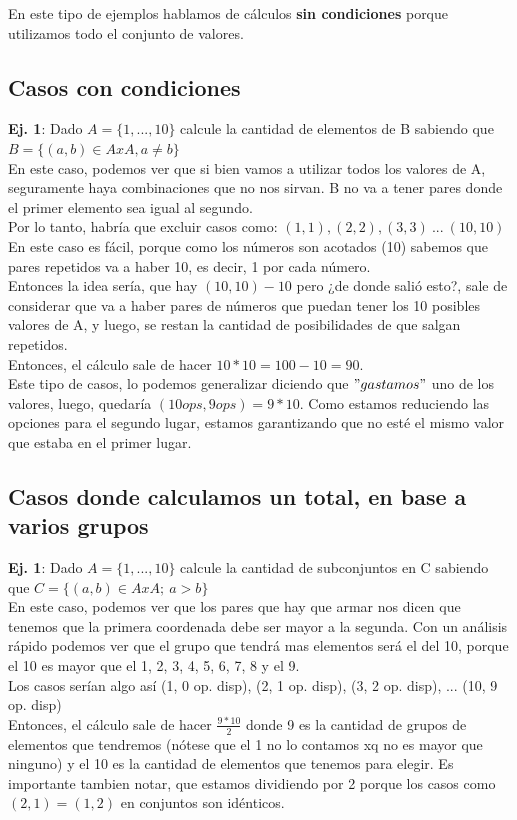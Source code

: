 \documentclass[10pt,a4paper]{article}
\begin{document}
En este tipo de ejemplos hablamos de cálculos \textbf{sin condiciones} porque utilizamos todo el conjunto de valores.
\subsection*{Casos con condiciones}
\textbf{Ej. 1}: Dado $A = \{1, ..., 10\}$ calcule la cantidad de elementos de B sabiendo que $ B = \{(a, b) \in AxA, a \neq b\}$ \\
En este caso, podemos ver que si bien vamos a utilizar todos los valores de A, seguramente haya combinaciones que no nos sirvan. B no va a tener pares donde el primer elemento sea igual al segundo. \\
Por lo tanto, habría que excluir casos como: $(1, 1), (2, 2), (3, 3) \ ...\ (10, 10)$ \\
En este caso es fácil, porque como los números son acotados (10) sabemos que pares repetidos va a haber 10, es decir, 1 por cada número. \\
Entonces la idea sería, que hay $(10, 10) - 10$ pero ¿de donde salió esto?, sale de considerar que va a haber pares de números que puedan tener los 10 posibles valores de A, y luego, se restan la cantidad de posibilidades de que salgan repetidos. \\
Entonces, el cálculo sale de hacer $10 \ast 10 = 100 - 10 = 90$. \\
Este tipo de casos, lo podemos generalizar diciendo que $"gastamos"$ uno de los valores, luego, quedaría $(10 ops, 9 ops) = 9 \ast 10$. Como estamos reduciendo las opciones para el segundo lugar, estamos garantizando que no esté el mismo valor que estaba en el primer lugar.
\subsection*{Casos donde calculamos un total, en base a varios grupos}
\textbf{Ej. 1}: Dado $A = \{1, ..., 10\}$ calcule la cantidad de subconjuntos en C sabiendo que $ C = \{(a, b) \in AxA; \ a > b\}$ \\
En este caso, podemos ver que los pares que hay que armar nos dicen que tenemos que la primera coordenada debe ser mayor a la segunda. Con un análisis rápido podemos ver que el grupo que tendrá mas elementos será el del 10, porque el 10 es mayor que el 1, 2, 3, 4, 5, 6, 7, 8 y el 9. \\
Los casos serían algo así (1, 0 op. disp), (2, 1 op. disp), (3, 2 op. disp), ... (10, 9 op. disp) \\
Entonces, el cálculo sale de hacer $\frac{9 \ast 10}{2}$ donde 9 es la cantidad de grupos de elementos que tendremos (nótese que el 1 no lo contamos xq no es mayor que ninguno) y el 10 es la cantidad de elementos que tenemos para elegir. Es importante tambien notar, que estamos dividiendo por 2 porque los casos como $(2, 1) = (1, 2)$ en conjuntos son idénticos. 
\end{document}
